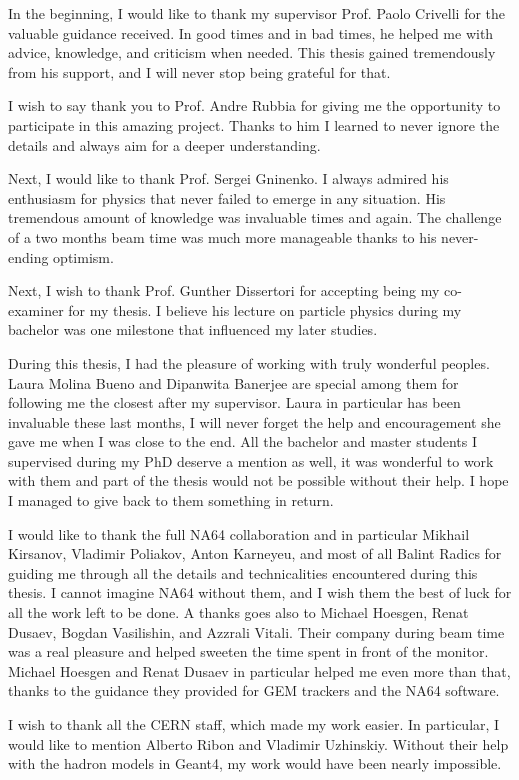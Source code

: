 In the beginning, I would like to thank my supervisor Prof. Paolo Crivelli for the valuable guidance received. In good times and in bad times, he helped me with advice, knowledge, and criticism when needed. This thesis gained tremendously from his support, and I will never stop being grateful for that. 

I wish to say thank you to Prof. Andre Rubbia for giving me the opportunity to participate in this amazing project. Thanks to him I learned to never ignore the details and always aim for a deeper understanding.

Next, I would like to thank Prof. Sergei Gninenko. I always admired his enthusiasm for physics that never failed to emerge in any situation. His tremendous amount of knowledge was invaluable times and again. The challenge of a two months beam time was much more manageable thanks to his never-ending optimism.

Next, I wish to thank Prof. Gunther Dissertori for accepting being my co-examiner for my thesis. I believe his lecture on particle physics during my bachelor was one milestone that influenced my later studies.

During this thesis, I had the pleasure of working with truly wonderful peoples. Laura Molina Bueno and Dipanwita Banerjee are special among them for following me the closest after my supervisor. Laura in particular has been invaluable these last months, I will never forget the help and encouragement she gave me when I was close to the end. All the bachelor and master students I supervised during my PhD deserve a mention as well, it was wonderful to work with them and part of the thesis would not be possible without their help. I hope I managed to give back to them something in return.

I would like to thank the full NA64 collaboration and in particular Mikhail Kirsanov, Vladimir Poliakov, Anton Karneyeu, and most of all Balint Radics for guiding me through all the details and technicalities encountered during this thesis. I cannot imagine NA64 without them, and I wish them the best of luck for all the work left to be done. A thanks goes also to Michael Hoesgen, Renat Dusaev, Bogdan Vasilishin, and Azzrali Vitali. Their company during beam time was a real pleasure and helped sweeten the time spent in front of the monitor. Michael Hoesgen and Renat Dusaev in particular helped me even more than that, thanks to the guidance they provided for GEM trackers and the NA64 software.

I wish to thank all the CERN staff, which made my work easier. In particular, I would like to mention Alberto Ribon and Vladimir Uzhinskiy. Without their help with the hadron models in Geant4, my work would have been nearly impossible.

